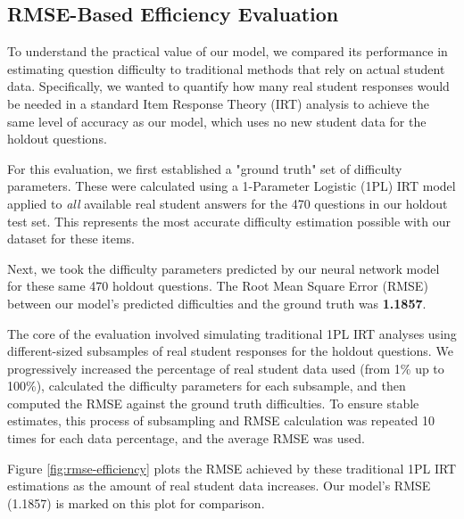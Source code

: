 \documentclass[
    a4paper, %
    10pt, %
    twoside, %
]{LTJournalArticle}
\begin{document}
\subsection{RMSE-Based Efficiency Evaluation}

To understand the practical value of our model, we compared its performance in estimating question difficulty to traditional methods that rely on actual student data. Specifically, we wanted to quantify how many real student responses would be needed in a standard Item Response Theory (IRT) analysis to achieve the same level of accuracy as our model, which uses no new student data for the holdout questions.

For this evaluation, we first established a "ground truth" set of difficulty parameters. These were calculated using a 1-Parameter Logistic (1PL) IRT model applied to \textit{all} available real student answers for the 470 questions in our holdout test set. This represents the most accurate difficulty estimation possible with our dataset for these items.

Next, we took the difficulty parameters predicted by our neural network model for these same 470 holdout questions. The Root Mean Square Error (RMSE) between our model's predicted difficulties and the ground truth was \textbf{1.1857}.

The core of the evaluation involved simulating traditional 1PL IRT analyses using different-sized subsamples of real student responses for the holdout questions. We progressively increased the percentage of real student data used (from 1\% up to 100\%), calculated the difficulty parameters for each subsample, and then computed the RMSE against the ground truth difficulties. To ensure stable estimates, this process of subsampling and RMSE calculation was repeated 10 times for each data percentage, and the average RMSE was used.

Figure \ref{fig:rmse-efficiency} plots the RMSE achieved by these traditional 1PL IRT estimations as the amount of real student data increases. Our model's RMSE (1.1857) is marked on this plot for comparison. 
\end{document}
